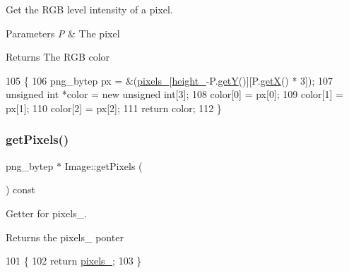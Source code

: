 Get the R\+GB level intensity of a pixel. 


\begin{DoxyParams}{Parameters}
{\em P} & The pixel \\
\hline
\end{DoxyParams}
\begin{DoxyReturn}{Returns}
The R\+GB color 
\end{DoxyReturn}

\begin{DoxyCode}
105                                           \{
106     png\_bytep px = \&(\mbox{\hyperlink{class_image_a51351c8507499d09cb9667c20ef01faf}{pixels\_}}[\mbox{\hyperlink{class_image_a64a699c5bb8e8a18c6971a8032806dba}{height\_}}-P.\mbox{\hyperlink{class_point_a86d10ff46e08462c45b15a8c7ef62d61}{getY}}()][P.\mbox{\hyperlink{class_point_ac9d5859db121c7d1b89ca89266dca0a3}{getX}}() * 3]);
107     \textcolor{keywordtype}{unsigned} \textcolor{keywordtype}{int} *color = \textcolor{keyword}{new} \textcolor{keywordtype}{unsigned} \textcolor{keywordtype}{int}[3];
108     color[0] = px[0];
109     color[1] = px[1];
110     color[2] = px[2];
111     \textcolor{keywordflow}{return} color;
112 \}
\end{DoxyCode}
\mbox{\label{class_image_a434149170df3e6fad24cc123c8ff029d}} 
\subsubsection{\texorpdfstring{get\+Pixels()}{getPixels()}}
{\footnotesize\ttfamily png\+\_\+bytep $\ast$ Image\+::get\+Pixels (\begin{DoxyParamCaption}{ }\end{DoxyParamCaption}) const}



Getter for pixels\+\_\+. 

\begin{DoxyReturn}{Returns}
the pixels\+\_\+ ponter 
\end{DoxyReturn}

\begin{DoxyCode}
101                                   \{
102     \textcolor{keywordflow}{return} \mbox{\hyperlink{class_image_a51351c8507499d09cb9667c20ef01faf}{pixels\_}};
103 \}
\end{DoxyCode}
\mbox{\label{class_image_ac34bdffd357a50025e6a72deb02596b5}} 
